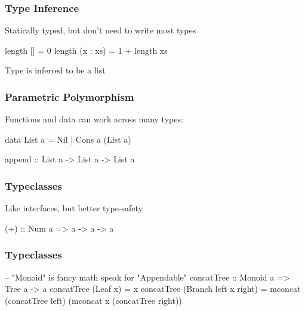 \begin{frame}[fragile]
  \frametitle{Type Inference}

  Statically typed, but don't need to write most types

  \begin{semiverbatim}
length [] = 0
length (x : xs) = 1 + length xs
  \end{semiverbatim}

  Type is inferred to be a list
\end{frame}

\begin{frame}[fragile]
  \frametitle{Parametric Polymorphism}

  Functions and data can work across many types:

  \begin{semiverbatim}
data List a = Nil | Cons a (List a)

append :: List a -> List a -> List a
  \end{semiverbatim}
\end{frame}

\begin{frame}
  \frametitle{Typeclasses}

  Like interfaces, but better type-safety

  \begin{semiverbatim}
(+) :: Num a => a -> a -> a
  \end{semiverbatim}
\end{frame}

\begin{frame}[fragile]
  \frametitle{Typeclasses}
  \begin{semiverbatim}
-- "Monoid" is fancy math speak for "Appendable"
concatTree :: Monoid a => Tree a -> a
concatTree (Leaf x) = x
concatTree (Branch left x right) =
  mconcat (concatTree left)
          (mconcat x (concatTree right))
  \end{semiverbatim}
\end{frame}


  
